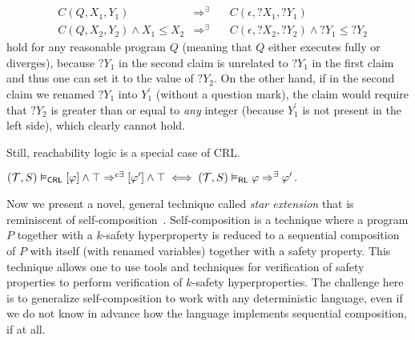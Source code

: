 \begin{align}
& C(Q, X_1, Y_1) & \Rightarrow^{\exists} \quad & C(\epsilon, ?X_1, ?Y_1) \\
& C(Q, X_2, Y_2) \land X_1 \leq X_2 & \Rightarrow^{\exists} \quad  & C(\epsilon, ?X_2, ?Y_2) \land ?Y_1 \leq ?Y_2
\end{align}
hold for any reasonable program $Q$ (meaning that $Q$ either executes fully or diverges),
because $?Y_1$ in the second claim is unrelated to $?Y_1$ in the first claim and thus one can set it to
the value of $?Y_2$.
On the other hand, if in the second claim we renamed $?Y_1$ into $Y_1^\prime$ (without a question mark),
the claim would require that $?Y_2$ is greater than or equal to \emph{any} integer (because $Y_1^\prime$ is not present in the left side),
which clearly cannot hold.

Still, reachability logic is a special case of CRL.
\begin{remark}
$
    (\mathcal{T}, S) \vDash_{\mathsf{CRL}}
    [\varphi] \land \top  \Rightarrow^{c\exists}
    [\varphi^\prime] \land \top
    \iff
    (\mathcal{T}, S) \vDash_{\mathsf{RL}} \varphi \Rightarrow^{\exists} \varphi^\prime \, .
$
\end{remark}


Now we present a novel, general technique called \emph{star extension} that is reminiscent of self-composition~\cite{BartheDR11}.
Self-composition is a technique where a program $P$ together with a $k$-safety hyperproperty is reduced to
a sequential composition of $P$ with itself (with renamed variables) together with a safety property.
This technique allows one to use tools and techniques for verification of safety properties
to perform verification of $k$-safety hyperproperties.
The challenge here is to generalize self-composition to work with any deterministic language,
even if we do not know in advance how the language implements sequential composition, if at all.


